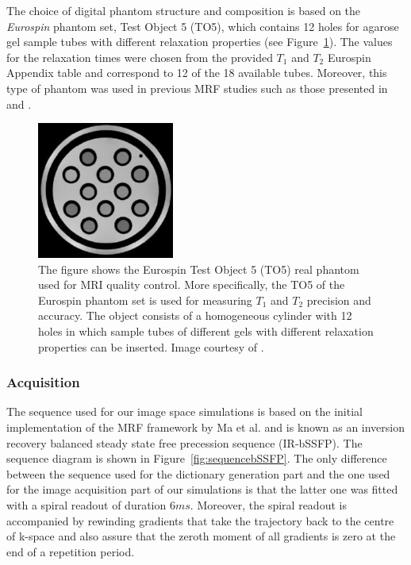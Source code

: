 \hfill

The choice of digital phantom structure and composition is based on the \textit{Eurospin} 
phantom set, Test Object 5 (TO5), which contains 12 holes for agarose gel sample tubes with different relaxation properties \cite{Ihalainen2004} (see Figure~\ref{fig:realPhantom}).
The values for the relaxation times were chosen from the provided $T_1$ and $T_2$ Eurospin Appendix table and correspond to 12 of the 18 available tubes.
Moreover, this type of phantom was used in previous MRF studies such as those presented in \cite{Doneva2016} and \cite{Sommer2017}.

\begin{figure}[ht]
    \centering
    \includegraphics[angle=0,width=0.4\textwidth, keepaspectratio]{images/mrf/realPhantom}
    \caption{The figure shows the Eurospin Test Object 5 (TO5) real phantom used for MRI quality control.
    More specifically, the TO5 of the Eurospin phantom set is used for measuring $T_1$ and $T_2$ precision and accuracy.
    The object consists of a homogeneous cylinder with 12 holes in which sample tubes of different gels with different relaxation properties can be inserted. Image courtesy of \cite{Ihalainen2004}.}
    \label{fig:realPhantom}
\end{figure}

\subsubsection{Acquisition}

The sequence used for our image space simulations is based on the initial implementation of the MRF framework by Ma et al. \cite{Ma2013} and is known as an inversion recovery balanced steady state free precession sequence (IR-bSSFP).
The sequence diagram is shown in Figure~\ref{fig:sequencebSSFP}.
The only difference between the sequence used for the dictionary generation part and the one used for the image acquisition part of our simulations is that the latter one was fitted with a spiral readout of duration $6 ms$.
Moreover, the spiral readout is accompanied by rewinding gradients that take the trajectory back to the centre of k-space and also assure that the zeroth moment of all gradients is zero at the end of a repetition period.

